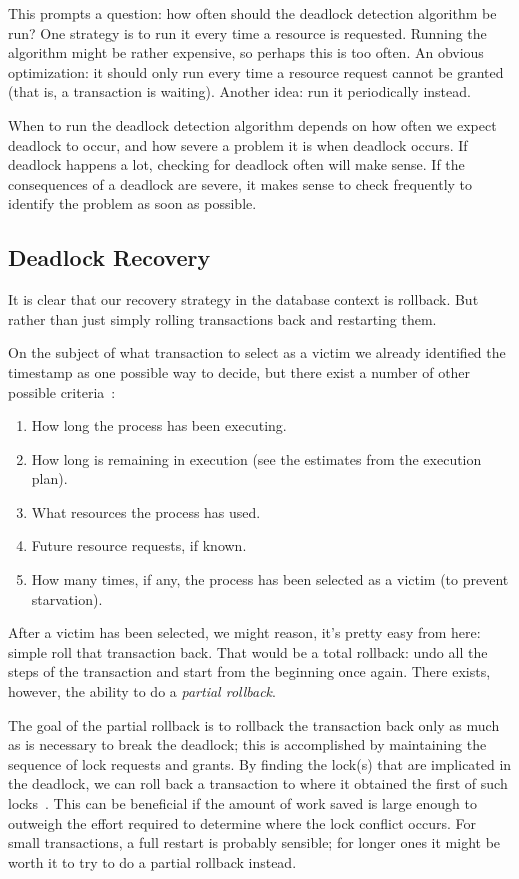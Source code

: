 This prompts a question: how often should the deadlock detection algorithm be run? One strategy is to run it every time a resource is requested. Running the algorithm might be rather expensive, so perhaps this is too often. An obvious optimization: it should only run every time a resource request cannot be granted (that is, a transaction is waiting). Another idea: run it periodically instead.

When to run the deadlock detection algorithm depends on how often we expect deadlock to occur, and how severe a problem it is when deadlock occurs. If deadlock happens a lot, checking for deadlock often will make sense. If the consequences of a deadlock are severe, it makes sense to check frequently to identify the problem as soon as possible.

\subsection*{Deadlock Recovery}

It is clear that our recovery strategy in the database context is rollback. But rather than just simply rolling transactions back and restarting them. 

On the subject of what transaction to select as a victim we already identified the timestamp as one possible way to decide, but there exist a number of other possible criteria~\cite{dsc}:

\begin{enumerate}
\item How long the process has been executing.
	\item How long is remaining in execution (see the estimates from the execution plan).
	\item What resources the process has used.
	\item Future resource requests, if known.
	\item How many times, if any, the process has been selected as a victim (to prevent starvation).
\end{enumerate}

After a victim has been selected, we might reason, it's pretty easy from here: simple roll that transaction back. That would be a total rollback: undo all the steps of the transaction and start from the beginning once again. There exists, however, the ability to do a \textit{partial rollback}. 

The goal of the partial rollback is to rollback the transaction back only as much as is necessary to break the deadlock;  this is accomplished by maintaining the sequence of lock requests and grants. By finding the lock(s) that are implicated in the deadlock, we can roll back a transaction to where it obtained the first of such locks~\cite{dsc}. This can be beneficial if the amount of work saved is large enough to outweigh the effort required to determine where the lock conflict occurs. For small transactions, a full restart is probably sensible; for longer ones it might be worth it to try to do a partial rollback instead.

